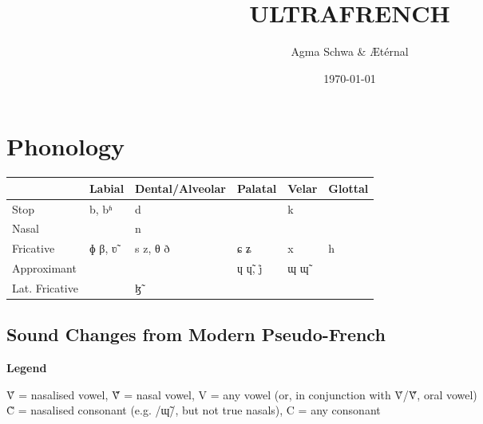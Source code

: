 \documentclass[a4paper, 12pt, oneside, final]{article}
\title{ULTRAFRENCH}
\author{Agma Schwa \& Ætérnal}
\date{\today}
\def\parheading#1{\noindent\textbf{#1}}
\begin{document}
\maketitle
\clearpage

\section{Phonology}\label{sec:phonology}{\def\arraystretch{1.2}
\noindent\begin{tabular}{@{}|>{}l|>{}l|>{}l|>{}l|>{}l|>{}l|}                 \hline
                   & Labial & Dental/Alveolar & Palatal  & Velar & Glottal \\\hline
    Stop           & b, bʱ  & d               &          & k     &         \\\hline
    Nasal          &        & n               &          &       &         \\\hline
    Fricative      & ɸ β, ʋ̃ & s z, θ ð        & ɕ ʑ      & x     & h       \\\hline
    Approximant    &        &                 & ɥ ɥ̃, j̊   & ɰ ɰ̃   &         \\\hline
    Lat. Fricative &        & ɮ̃               &          &       &         \\\hline
\end{tabular}}

\subsection{Sound Changes from Modern Pseudo-French}\label{subsec:sound-changes-from-modern-french}
\parheading{Legend}\par\medskip\noindent
Ṽ = nasalised vowel, Ṽ̃ = nasal vowel, V = any vowel (or, in conjunction with Ṽ/Ṽ̃, oral vowel)\\
C̃ = nasalised consonant (e.g. /ɰ̃/, but not true nasals), C = any consonant\\
\end{document}
